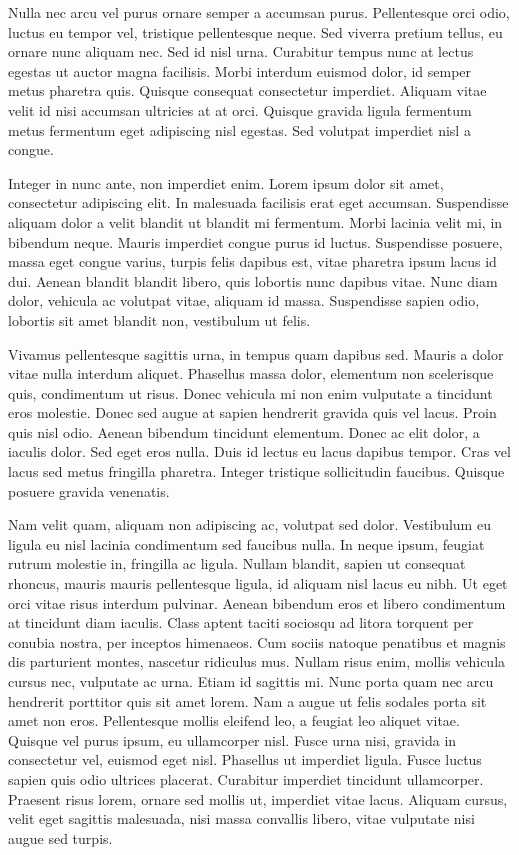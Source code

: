 Nulla nec arcu vel purus ornare semper a accumsan purus. Pellentesque orci odio, luctus eu tempor vel, tristique pellentesque neque. Sed viverra pretium tellus, eu ornare nunc aliquam nec. Sed id nisl urna. Curabitur tempus nunc at lectus egestas ut auctor magna facilisis. Morbi interdum euismod dolor, id semper metus pharetra quis. Quisque consequat consectetur imperdiet. Aliquam vitae velit id nisi accumsan ultricies at at orci. Quisque gravida ligula fermentum metus fermentum eget adipiscing nisl egestas. Sed volutpat imperdiet nisl a congue.

Integer in nunc ante, non imperdiet enim. Lorem ipsum dolor sit amet, consectetur adipiscing elit. In malesuada facilisis erat eget accumsan. Suspendisse aliquam dolor a velit blandit ut blandit mi fermentum. Morbi lacinia velit mi, in bibendum neque. Mauris imperdiet congue purus id luctus. Suspendisse posuere, massa eget congue varius, turpis felis dapibus est, vitae pharetra ipsum lacus id dui. Aenean blandit blandit libero, quis lobortis nunc dapibus vitae. Nunc diam dolor, vehicula ac volutpat vitae, aliquam id massa. Suspendisse sapien odio, lobortis sit amet blandit non, vestibulum ut felis.

Vivamus pellentesque sagittis urna, in tempus quam dapibus sed. Mauris a dolor vitae nulla interdum aliquet. Phasellus massa dolor, elementum non scelerisque quis, condimentum ut risus. Donec vehicula mi non enim vulputate a tincidunt eros molestie. Donec sed augue at sapien hendrerit gravida quis vel lacus. Proin quis nisl odio. Aenean bibendum tincidunt elementum. Donec ac elit dolor, a iaculis dolor. Sed eget eros nulla. Duis id lectus eu lacus dapibus tempor. Cras vel lacus sed metus fringilla pharetra. Integer tristique sollicitudin faucibus. Quisque posuere gravida venenatis.

Nam velit quam, aliquam non adipiscing ac, volutpat sed dolor. Vestibulum eu ligula eu nisl lacinia condimentum sed faucibus nulla. In neque ipsum, feugiat rutrum molestie in, fringilla ac ligula. Nullam blandit, sapien ut consequat rhoncus, mauris mauris pellentesque ligula, id aliquam nisl lacus eu nibh. Ut eget orci vitae risus interdum pulvinar. Aenean bibendum eros et libero condimentum at tincidunt diam iaculis. Class aptent taciti sociosqu ad litora torquent per conubia nostra, per inceptos himenaeos. Cum sociis natoque penatibus et magnis dis parturient montes, nascetur ridiculus mus. Nullam risus enim, mollis vehicula cursus nec, vulputate ac urna. Etiam id sagittis mi. Nunc porta quam nec arcu hendrerit porttitor quis sit amet lorem. Nam a augue ut felis sodales porta sit amet non eros. Pellentesque mollis eleifend leo, a feugiat leo aliquet vitae. Quisque vel purus ipsum, eu ullamcorper nisl. Fusce urna nisi, gravida in consectetur vel, euismod eget nisl. Phasellus ut imperdiet ligula. Fusce luctus sapien quis odio ultrices placerat. Curabitur imperdiet tincidunt ullamcorper. Praesent risus lorem, ornare sed mollis ut, imperdiet vitae lacus. Aliquam cursus, velit eget sagittis malesuada, nisi massa convallis libero, vitae vulputate nisi augue sed turpis.

